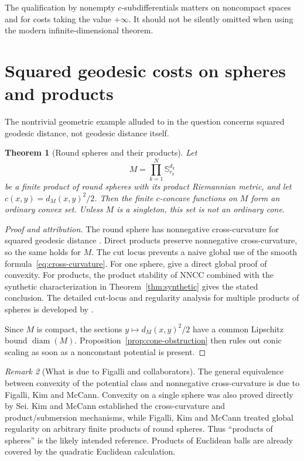 \documentclass[11pt,a4paper]{article}
\newtheorem{theorem}{Theorem}[section]
\theoremstyle{definition}
\theoremstyle{remark}
\newtheorem{remark}[theorem]{Remark}
\begin{document}
The qualification by nonempty $c$-subdifferentials matters on noncompact spaces
and for costs taking the value $+\infty$. It should not be silently omitted
when using the modern infinite-dimensional theorem.

\section{Squared geodesic costs on spheres and products}\label{sec:spheres}

The nontrivial geometric example alluded to in the question concerns squared
geodesic distance, not geodesic distance itself.

\begin{theorem}[Round spheres and their products]\label{thm:spheres}
Let
\[
  M=\prod_{k=1}^N\mathbb S^{d_k}_{r_k}
\]
be a finite product of round spheres with its product Riemannian metric, and
let $c(x,y)=d_M(x,y)^2/2$. Then the finite $c$-concave functions on $M$ form an
ordinary convex set. Unless $M$ is a singleton, this set is not an ordinary
cone.
\end{theorem}

\begin{proof}[Proof and attribution]
The round sphere has nonnegative cross-curvature for squared geodesic distance
\citep{KimMcCann2012}. Direct products preserve nonnegative cross-curvature, so
the same holds for $M$. The cut locus prevents a naive global use of the smooth
formula~\eqref{eq:cross-curvature}. For one sphere, \citet{Sei2013} give a
direct global proof of convexity. For products, the product stability of NNCC
combined with the synthetic characterization in Theorem~\ref{thm:synthetic}
gives the stated conclusion. The detailed cut-locus and regularity analysis for
multiple products of spheres is developed by
\citet{FigalliKimMcCann2013}.

Since $M$ is compact, the sections $y\mapsto d_M(x,y)^2/2$ have a common
Lipschitz bound $\operatorname{diam}(M)$. Proposition~\ref{prop:cone-obstruction}
then rules out conic scaling as soon as a nonconstant potential is present.
\end{proof}

\begin{remark}[What is due to Figalli and collaborators]
The general equivalence between convexity of the potential class and
nonnegative cross-curvature is due to Figalli, Kim and McCann. Convexity on a
single sphere was also proved directly by Sei. Kim and McCann established the
cross-curvature and product/submersion mechanisms, while Figalli, Kim and
McCann treated global regularity on arbitrary finite products of round spheres.
Thus ``products of spheres'' is the likely intended reference. Products of
Euclidean balls are already covered by the quadratic Euclidean calculation.
\end{remark}
\end{document}
